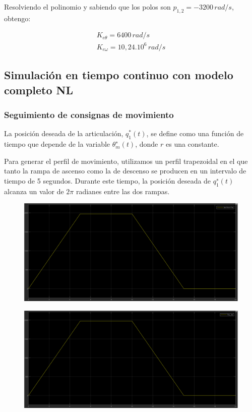 \documentclass{article}
\begin{document}
Resolviendo el polinomio y sabiendo que los polos son $p_{1,2} = -3200\, rad/s$, obtengo:

\begin{align*}
    K_{e\theta} = 6400\,rad/s \\
    K_{e\omega} = 10,24.10^6\,rad/s
\end{align*}



\subsection{Simulación en tiempo continuo con modelo completo NL}

\subsubsection{Seguimiento de consignas de movimiento}

La posición deseada de la articulación, $q^*_1(t)$, se define como una función de tiempo que depende 
de la variable $θ^∗_m(t)$, donde $r$ es una constante. 

Para generar el perfil de movimiento, utilizamos un perfil trapezoidal en el que tanto la rampa de 
ascenso como la de descenso se producen en un intervalo de tiempo de 5 segundos. Durante este tiempo,
la posición deseada de $q^∗_1(t)$ alcanza un valor de $2\pi$ radianes entre las dos rampas.

\begin{figure}[H]
    \centering
    \includegraphics[width=1\textwidth]{perfil_trapezoidal.png}
\end{figure}

\begin{figure}[H]
    \centering
    \includegraphics[width=1\textwidth]{5.2.4.a.2.png}
\end{figure}
\end{document}
